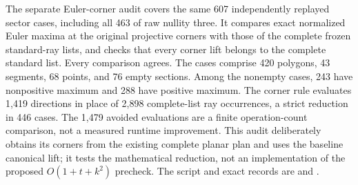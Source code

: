 

The separate Euler-corner audit covers the same 607 independently replayed
sector cases, including all 463 of raw nullity three. It compares exact
normalized Euler maxima at the original projective corners with those of
the complete frozen standard-ray lists, and checks that every corner lift
belongs to the complete standard list. Every comparison agrees.
The cases comprise 420 polygons, 43 segments, 68 points, and 76 empty
sections. Among the nonempty cases, 243 have nonpositive maximum and 288
have positive maximum. The corner rule evaluates 1,419 directions in place
of 2,898 complete-list ray occurrences, a strict reduction in 446 cases.
The 1,479 avoided evaluations are a finite operation-count comparison,
not a measured runtime improvement. This audit deliberately obtains its
corners from the existing complete planar plan and uses the baseline
canonical lift; it tests the mathematical reduction, not an implementation
of the proposed $O(1+t+k^2)$ precheck. The script and exact records are
 and
.
